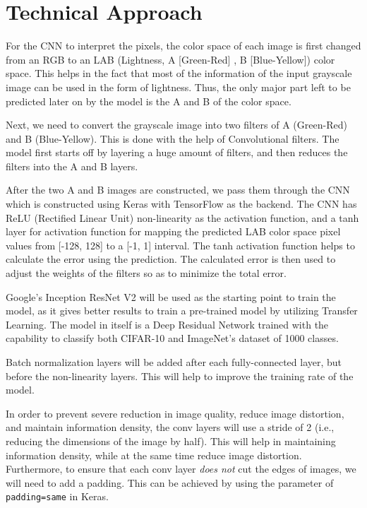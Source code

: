 \documentclass[10pt,twocolumn,letterpaper]{article}
\begin{document}
\section{Technical Approach}
For the CNN to interpret the pixels, the color space of each image is first changed from an RGB to an LAB (Lightness, A [Green-Red] , B [Blue-Yellow]) color space. This helps in the fact that most of the information of the input grayscale image can be used in the form of lightness. Thus, the only major part left to be predicted later on by the model is the A and B of the color space.

Next, we need to convert the grayscale image into two filters of A (Green-Red) and B (Blue-Yellow). This is done with the help of Convolutional filters. The model first starts off by layering a huge amount of filters, and then reduces the filters into the A and B layers.

After the two A and B images are constructed, we pass them through the CNN which is constructed using Keras with TensorFlow as the backend. The CNN has ReLU (Rectified Linear Unit) non-linearity as the activation function, and a tanh layer for activation function for mapping the predicted LAB color space pixel values from [-128, 128] to a [-1, 1] interval. The tanh activation function helps to calculate the error using the prediction. The calculated error is then used to adjust the weights of the filters so as to minimize the total error.

Google's Inception ResNet V2 will be used as the starting point to train the model, as it gives better results to train a pre-trained model by utilizing Transfer Learning. The model in itself is a Deep Residual Network trained with the capability to classify both CIFAR-10 and ImageNet's dataset of 1000 classes.

Batch normalization layers will be added after each fully-connected layer, but before the non-linearity layers. This will help to improve the training rate of the model.

In order to prevent severe reduction in image quality, reduce image distortion, and maintain information density, the conv layers will use a stride of 2 (i.e., reducing the dimensions of the image by half). This will help in maintaining information density, while at the same time reduce image distortion. Furthermore, to ensure that each conv layer \textit{does not} cut the edges of images, we will need to add a padding. This can be achieved by using the parameter of \verb|padding=same| in Keras.
\end{document}
